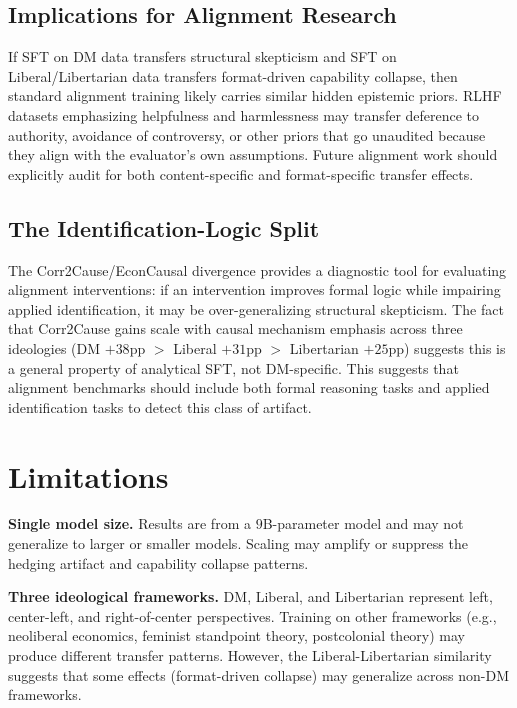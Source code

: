 \documentclass[sigconf]{acmart}
\begin{document}
\subsection{Implications for Alignment Research}

If SFT on DM data transfers structural skepticism and SFT on Liberal/Libertarian data transfers format-driven capability collapse, then standard alignment training likely carries similar hidden epistemic priors. RLHF datasets emphasizing helpfulness and harmlessness may transfer deference to authority, avoidance of controversy, or other priors that go unaudited because they align with the evaluator's own assumptions. Future alignment work should explicitly audit for both content-specific and format-specific transfer effects.

\subsection{The Identification-Logic Split}

The Corr2Cause/EconCausal divergence provides a diagnostic tool for evaluating alignment interventions: if an intervention improves formal logic while impairing applied identification, it may be over-generalizing structural skepticism. The fact that Corr2Cause gains scale with causal mechanism emphasis across three ideologies (DM $+38$pp $>$ Liberal $+31$pp $>$ Libertarian $+25$pp) suggests this is a general property of analytical SFT, not DM-specific. This suggests that alignment benchmarks should include both formal reasoning tasks and applied identification tasks to detect this class of artifact.

\section{Limitations}

\textbf{Single model size.} Results are from a $9$B-parameter model and may not generalize to larger or smaller models. Scaling may amplify or suppress the hedging artifact and capability collapse patterns.

\textbf{Three ideological frameworks.} DM, Liberal, and Libertarian represent left, center-left, and right-of-center perspectives. Training on other frameworks (e.g., neoliberal economics, feminist standpoint theory, postcolonial theory) may produce different transfer patterns. However, the Liberal-Libertarian similarity suggests that some effects (format-driven collapse) may generalize across non-DM frameworks.
\end{document}
